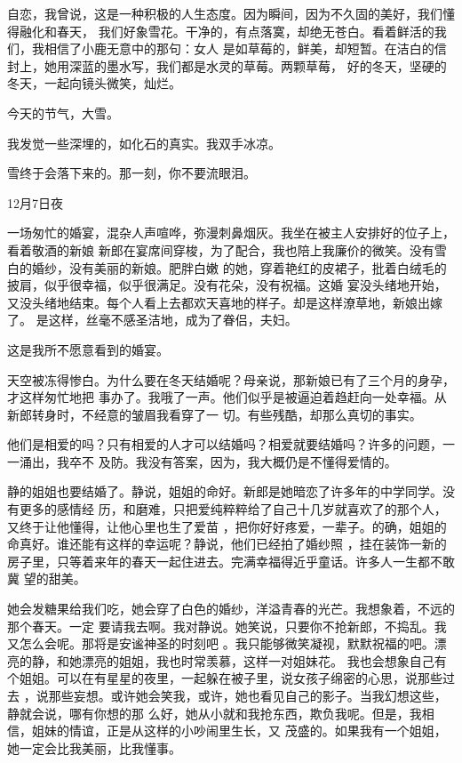 \documentclass[12pt,a4paper]{article}
\begin{document}
		自恋，我曾说，这是一种积极的人生态度。因为瞬间，因为不久固的美好，我们懂得融化和春天，
	我们好象雪花。干净的，有点落寞，却绝无苍白。看着鲜活的我们，我相信了小鹿无意中的那句：女人
	是如草莓的，鲜美，却短暂。在洁白的信封上，她用深蓝的墨水写，我们都是水灵的草莓。两颗草莓，
	好的冬天，坚硬的冬天，一起向镜头微笑，灿烂。


		今天的节气，大雪。

		我发觉一些深埋的，如化石的真实。我双手冰凉。

		雪终于会落下来的。那一刻，你不要流眼泪。

		12月7日夜

	\endwriting



		一场匆忙的婚宴，混杂人声喧哗，弥漫刺鼻烟灰。我坐在被主人安排好的位子上，看着敬酒的新娘
	新郎在宴席间穿梭，为了配合，我也陪上我廉价的微笑。没有雪白的婚纱，没有美丽的新娘。肥胖白嫩
	的她，穿着艳红的皮裙子，批着白绒毛的披肩，似乎很幸福，似乎很满足。没有花朵，没有祝福。这婚
	宴没头绪地开始，又没头绪地结束。每个人看上去都欢天喜地的样子。却是这样潦草地，新娘出嫁了。
	是这样，丝毫不感圣洁地，成为了眷侣，夫妇。


		这是我所不愿意看到的婚宴。


		天空被冻得惨白。为什么要在冬天结婚呢？母亲说，那新娘已有了三个月的身孕，才这样匆忙地把
	事办了。我哦了一声。他们似乎是被逼迫着趋赶向一处幸福。从新郎转身时，不经意的皱眉我看穿了一
	切。有些残酷，却那么真切的事实。

		他们是相爱的吗？只有相爱的人才可以结婚吗？相爱就要结婚吗？许多的问题，一一涌出，我卒不
	及防。我没有答案，因为，我大概仍是不懂得爱情的。


		静的姐姐也要结婚了。静说，姐姐的命好。新郎是她暗恋了许多年的中学同学。没有更多的感情经
	历，和磨难，只把爱纯粹粹给了自己十几岁就喜欢了的那个人，又终于让他懂得，让他心里也生了爱苗
	，把你好好疼爱，一辈子。的确，姐姐的命真好。谁还能有这样的幸运呢？静说，他们已经拍了婚纱照
	，挂在装饰一新的房子里，只等着来年的春天一起住进去。完满幸福得近乎童话。许多人一生都不敢冀
	望的甜美。


		她会发糖果给我们吃，她会穿了白色的婚纱，洋溢青春的光芒。我想象着，不远的那个春天。一定
	要请我去啊。我对静说。她笑说，只要你不抢新郎，不捣乱。我又怎么会呢。那将是安谧神圣的时刻吧
	。我只能够微笑凝视，默默祝福的吧。漂亮的静，和她漂亮的姐姐，我也时常羡慕，这样一对姐妹花。
	我也会想象自己有个姐姐。可以在有星星的夜里，一起躲在被子里，说女孩子绵密的心思，说那些过去
	，说那些妄想。或许她会笑我，或许，她也看见自己的影子。当我幻想这些，静就会说，哪有你想的那
	么好，她从小就和我抢东西，欺负我呢。但是，我相信，姐妹的情谊，正是从这样的小吵闹里生长，又
	茂盛的。如果我有一个姐姐，她一定会比我美丽，比我懂事。
\end{document}
